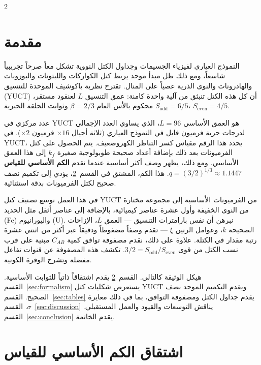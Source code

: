 \documentclass[11pt,a4paper]{article}
\begin{document}
	\begin{multicols}{2}
		
		\section{مقدمة}
		
		النموذج العياري لفيزياء الجسيمات وجداول الكتل النووية تشكل معاً صرحاً تجريبياً شاسعاً، ومع ذلك ظل مبدأ موحد يربط كتل الكواركات واللبتونات والبوزونات والهادرونات والنوى الذرية عصياً على المنال. تقترح نظرية ياكوشيف الموحدة للتنسيق (YUCT) أن كل هذه الكتل تنبثق من آلية واحدة كامنة: عمق التنسيق \(L\) لعنقود مستقر، محكوم بالأس العام \(\beta = 2/3\) وثوابت الحلقة الجبرية \(S_{\mathrm{odd}}=6/5\)، \(S_{\mathrm{even}}=4/5\).
		
		عدد مركزي في YUCT هو العمق الأساسي \(L = 96\)، الذي يساوي العدد الإجمالي لدرجات حرية فرميون فايل في النموذج العياري (ثلاثة أجيال $\times 16$ فرميون $\times 2$). في YUCT، يحدد هذا الرقم مقياس كسر التناظر الكهروضعيف. يتم الحصول على كتل الفرميونات بعد ذلك بإضافة أعداد صحيحة طوبولوجية صغيرة \(k_f\) إلى هذا العمق الأساسي. ومع ذلك، يظهر وصف أكثر أساسية عندما نقدم \textbf{الكم الأساسي للقياس} \(q = (3/2)^{1/3} \approx 1.1447\). هذا الكم، المشتق في القسم~\ref{sec:derivation}، يؤدي إلى تكميم نصف صحيح لكتل الفرميونات بدقة استثنائية.
		
		في هذا العمل نوسع تصنيف كتل YUCT من الفرميونات الأساسية إلى مجموعة مختارة من النوى الخفيفة وأول عشرة عناصر كيميائية، بالإضافة إلى عناصر أثقل مثل الحديد (Fe) واليورانيوم (U). نبرهن أن نفس بارامترات التنسيق — العمق \(L\)، الإزاحات الصحيحة \(k\)، وعوامل الرنين \(\xi\) — تقدم وصفاً مضغوطاً ودقيقاً عبر أكثر من اثنتي عشرة رتبة مقدار في الكتلة. علاوة على ذلك، نقدم مصفوفة توافق كمية \(C_{AB}\) مبنية على قرب نسب الكتل من قوى \(3/2 = S_{\mathrm{odd}}/S_{\mathrm{even}}\). تكشف هذه المصفوفة عن قنوات تفاعل مفضلة وتشرح الوفرة الكونية.
		
		هيكل الوثيقة كالتالي. القسم~\ref{sec:derivation} يقدم اشتقاقاً ذاتياً للثوابت الأساسية. القسم~\ref{sec:formalism} يستعرض شكليات كتل YUCT ويقدم التكميم الموحد نصف الصحيح. القسم~\ref{sec:tables} يقدم جداول الكتل ومصفوفة التوافق، بما في ذلك معايرة \(\sigma\). القسم~\ref{sec:discussion} يناقش التوسعات والقيود والعمل المستقبلي. القسم~\ref{sec:conclusion} يقدم الخاتمة.
		
		\section{اشتقاق الكم الأساسي للقياس}
		\label{sec:derivation}
		

\end{multicols}
\end{document}
